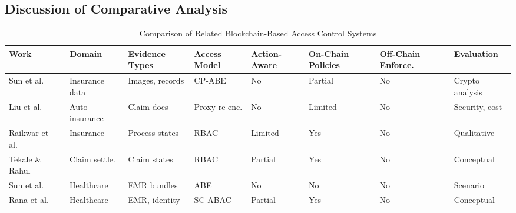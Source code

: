 \documentclass[final,5p,times,twocolumn]{elsarticle}
\begin{document}
\subsection{Discussion of Comparative Analysis}

\begin{table}[!htbp]
	\centering
	\small
	\caption{Comparison of Related Blockchain-Based Access Control Systems}
	\setlength{\tabcolsep}{4pt}
	\begin{tabular}{@{}p{2.8cm}p{2cm}p{2.2cm}p{2cm}p{1.8cm}p{1.5cm}p{1.5cm}p{2cm}@{}}
		\toprule
		\textbf{Work}                                   & \textbf{Domain}         & \textbf{Evidence Types}                     & \textbf{Access Model}    & \textbf{Action-Aware} & \textbf{On-Chain Policies} & \textbf{Off-Chain Enforce.} & \textbf{Evaluation}   \\
		\midrule
		Sun et al.~\cite{sun2020insurance}              & Insurance data          & Images, records                             & CP-ABE                   & No                    & Partial                    & No                          & Crypto analysis       \\
		\addlinespace[0.5ex]
		Liu et al.~\cite{liu2021auto}                   & Auto insurance          & Claim docs                                  & Proxy re-enc.            & No                    & Limited                    & No                          & Security, cost        \\
		\addlinespace[0.5ex]
		Raikwar et al.~\cite{raikwar2018insurance}      & Insurance               & Process states                              & RBAC                     & Limited               & Yes                        & No                          & Qualitative           \\
		\addlinespace[0.5ex]
		Tekale \& Rahul~\cite{tekale2023claims}         & Claim settle.           & Claim states                                & RBAC                     & Partial               & Yes                        & No                          & Conceptual            \\
		\addlinespace[0.5ex]
		Sun et al.~\cite{sun2020emr}                    & Healthcare              & EMR bundles                                 & ABE                      & No                    & No                         & No                          & Scenario              \\
		\addlinespace[0.5ex]
		Rana et al.~\cite{rana2022healthcare}           & Healthcare              & EMR, identity                               & SC-ABAC                  & Partial               & Yes                        & No                          & Conceptual            \\

\end{tabular}
\end{table}
\end{document}
